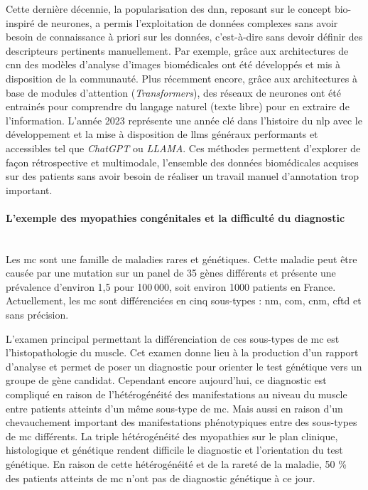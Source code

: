 Cette dernière décennie, la popularisation des \gls{dnn}, reposant sur le concept bio-inspiré de neurones, a permis l’exploitation de données complexes sans avoir besoin de connaissance à priori sur les données, c’est-à-dire sans devoir définir des descripteurs pertinents manuellement. Par exemple, grâce aux architectures de \gls{cnn} des modèles d’analyse d’images biomédicales ont été développés et mis à disposition de la communauté. Plus récemment encore, grâce aux architectures à base de modules d’attention (\textit{Transformers}), des réseaux de neurones ont été entrainés pour comprendre du langage naturel (texte libre) pour en extraire de l’information. L’année 2023 représente une année clé dans l’histoire du \gls{nlp} avec le développement et la mise à disposition de \gls{llms} généraux performants et accessibles tel que \textit{ChatGPT} ou \textit{LLAMA}. Ces méthodes permettent d’explorer de façon rétrospective et multimodale, l’ensemble des données biomédicales acquises sur des patients sans avoir besoin de réaliser un travail manuel d’annotation trop important.

\paragraph{\textbf{L’exemple des myopathies congénitales et la difficulté du diagnostic}}\mbox{}\\

Les \gls{mc} sont une famille de maladies rares et génétiques. Cette maladie peut être causée par une mutation sur un panel de 35 gènes différents et présente une prévalence d’environ 1,5 pour 100 000, soit environ 1000 patients en France. Actuellement, les \gls{mc} sont différenciées en cinq sous-types : \gls{nm}, \gls{com}, \gls{cnm}, \gls{cftd} et sans précision.

L’examen principal permettant la différenciation de ces sous-types de \gls{mc} est l’histopathologie du muscle. Cet examen donne lieu à la production d’un rapport d’analyse et permet de poser un diagnostic pour orienter le test génétique vers un groupe de gène candidat. Cependant encore aujourd’hui, ce diagnostic est compliqué en raison de l’hétérogénéité des manifestations au niveau du muscle entre patients atteints d’un même sous-type de \gls{mc}. Mais aussi en raison d’un chevauchement important des manifestations phénotypiques entre des sous-types de \gls{mc} différents. La triple hétérogénéité des myopathies sur le plan clinique, histologique et génétique rendent difficile le diagnostic et l’orientation du test génétique. En raison de cette hétérogénéité et de la rareté de la maladie, 50 \% des patients atteints de \gls{mc} n’ont pas de diagnostic génétique à ce jour. 

